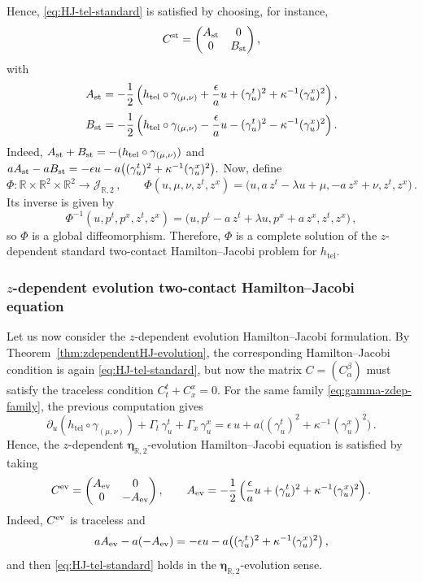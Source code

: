 \documentclass[11pt,twoside]{article}
\theoremstyle{plain}
\theoremstyle{definition}
\theoremstyle{remark}
\begin{document}
Hence, \eqref{eq:HJ-tel-standard} is satisfied by choosing, for instance,
\[
C^{\rm st}=
\begin{pmatrix}
A_{\rm st} & 0\\
0 & B_{\rm st}
\end{pmatrix},
\]
with
\[
A_{\rm st}
=
-\frac12\left(
h_{\mathrm{tel}}\circ\gamma_{(\mu,\nu)}
+\frac{\epsilon}{a}u
+(\gamma_u^t)^2+\kappa^{-1}(\gamma_u^x)^2
\right),
\]
\[
B_{\rm st}
=
-\frac12\left(
h_{\mathrm{tel}}\circ\gamma_{(\mu,\nu)}
-\frac{\epsilon}{a}u
-(\gamma_u^t)^2-\kappa^{-1}(\gamma_u^x)^2
\right).
\]
Indeed,
\(
A_{\rm st}+B_{\rm st}=-(h_{\mathrm{tel}}\circ\gamma_{(\mu,\nu)})
\)
and
\(
aA_{\rm st}-aB_{\rm st}
=
-\epsilon u-a\bigl((\gamma_u^t)^2+\kappa^{-1}(\gamma_u^x)^2\bigr).
\) 
Now, define
\[
\Phi\colon \mathbb R\times\mathbb R^2\times\mathbb R^2\to \mathcal J_{\mathbb R,2}\,,
\qquad
\Phi(u,\mu,\nu,z^t,z^x)
=
\bigl(u,a\,z^t-\lambda u+\mu,-a\,z^x+\nu,z^t,z^x\bigr)\,.
\]
Its inverse is given by
\[
\Phi^{-1}(u,p^t,p^x,z^t,z^x)
=
\bigl(u,p^t-a\,z^t+\lambda u,p^x+a\,z^x,z^t,z^x\bigr)\,,
\]
so \(\Phi\) is a global diffeomorphism. Therefore, \(\Phi\) is a complete solution of the
\(z\)-dependent standard two-contact Hamilton--Jacobi problem for \(h_{\mathrm{tel}}\).

\subsubsection{ \texorpdfstring{$z$}{}-dependent evolution two-contact Hamilton--Jacobi equation}

Let us now consider the $z$-dependent evolution Hamilton--Jacobi formulation. By Theorem~\ref{thm:zdependentHJ-evolution}, the corresponding
Hamilton--Jacobi condition is again \eqref{eq:HJ-tel-standard}, but now the matrix
\(
C=(C_\alpha^\beta)
\)
must satisfy the traceless condition
\(
C_t^t+C_x^x=0
\).
For the same family \eqref{eq:gamma-zdep-family}, the previous computation gives
\[
\partial_u(h_{\mathrm{tel}}\circ\gamma_{(\mu,\nu)})+\Gamma_t\,\gamma_u^t+\Gamma_x\,\gamma^x_u
=
\epsilon\,u+a\bigl((\gamma_u^t)^2+\kappa^{-1}(\gamma_u^x)^2\bigr)\,.
\]
Hence, the $z$-dependent $\bm\eta_{\mathbb{R},2}$-evolution  Hamilton--Jacobi equation is satisfied by taking
\[
C^{\rm ev}=
\begin{pmatrix}
A_{\rm ev} & 0\\
0 & -A_{\rm ev}
\end{pmatrix},
\qquad
A_{\rm ev}
=
-\frac12\left(
\frac{\epsilon}{a}u+(\gamma_u^t)^2+\kappa^{-1}(\gamma_u^x)^2
\right).
\]
Indeed, \(C^{\rm ev}\) is traceless and
\[
aA_{\rm ev}-a(-A_{\rm ev})
=
-\epsilon u-a\bigl((\gamma_u^t)^2+\kappa^{-1}(\gamma_u^x)^2\bigr)\,,
\]
and then \eqref{eq:HJ-tel-standard} holds in the $\bm\eta_{\mathbb{R},2}$-evolution sense.
\end{document}
